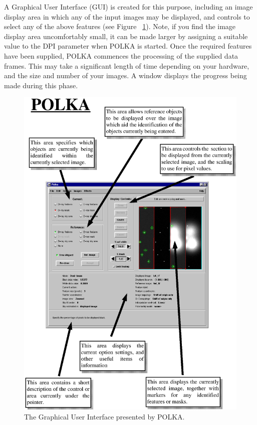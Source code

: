 \documentclass[twoside,11pt]{article}
\newenvironment{latexonly}{}{}
\renewcommand{\_}{\texttt{\symbol{95}}}
\begin{document}
A Graphical User Interface (GUI) is created for this purpose, including
an image display area in which any of the input images may be displayed,
and controls to select any of the above features (see Figure
~\ref{fig:polka}). Note, if you find the image display area uncomfortably
small, it can be made larger by assigning a suitable value to the DPI
parameter when POLKA is started. Once the required features have been
supplied, POLKA commences the processing of the supplied data frames.
This may take a significant length of time depending on your hardware,
and the size and number of your images. A window displays the progress
being made during this phase.

\begin{latexonly}
  \begin{figure}[htpb]
  \begin{center}
  \includegraphics[clip,scale=0.85]{sun223_figures/polka.eps}
  \vspace{4mm}
  \caption{The Graphical User Interface presented by POLKA.}
  \label{fig:polka}
  \end{center}
  \end{figure}
\end{latexonly}
\end{document}
